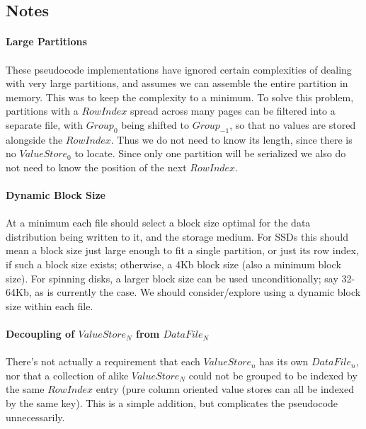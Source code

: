 \documentclass[fleqn]{article}
\begin{document}
\clearpage
\subsection{Notes}
\small
\paragraph{Large Partitions}
\paragraph{}
    These pseudocode implementations have ignored certain complexities of dealing with very large
    partitions, and assumes we can assemble the entire partition in memory. This was to keep
    the complexity to a minimum. To solve this problem,
    partitions with a $RowIndex$ spread across many pages can be filtered into a separate
    file, with $Group_0$ being shifted to $Group_{-1}$, so that no values are stored alongside
    the $RowIndex$. Thus we do not need to know its length, since there is no $ValueStore_0$ to locate.
    Since only one partition will be serialized we also do not need to know the position of the next $RowIndex$.
\paragraph{Dynamic Block Size}
\paragraph{}
    At a minimum each file should select a block size optimal for the data distribution being written to it, 
    and the storage medium. For SSDs this should mean a block size just large enough to fit a single partition, 
    or just its row index, if such a block size exists; otherwise, a 4Kb block size (also a minimum block size).
    For spinning disks, a larger block size can be used unconditionally; say 32-64Kb, as is currently the case.
    We should consider/explore using a dynamic block size within each file.
\paragraph{Decoupling of $ValueStore_N$ from $DataFile_N$}
\paragraph{}
    There's not actually a requirement that each $ValueStore_n$ has its own $DataFile_n$, nor that a collection
    of alike $ValueStore_N$ could not be grouped to be indexed by the same $RowIndex$ entry (pure column oriented
    value stores can all be indexed by the same key). This is a simple addition, but complicates the pseudocode
    unnecessarily.
\end{document}
